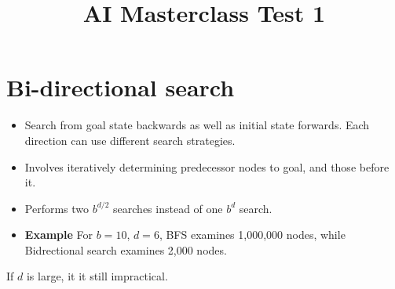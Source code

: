 \documentclass[12pt, a4paper]{article}
\title{AI Masterclass Test 1}
\author{}
\date{}
\begin{document}
\section{Bi-directional search}
\begin{itemize}
    \item Search from goal state backwards as well as initial state forwards. Each direction can use different search strategies.
    \item Involves iteratively determining predecessor nodes to goal, and those before it.
    \item Performs two $b^{d/2}$ searches instead of one $b^d$ search.
    \item \textbf{Example} For $b=10$, $d=6$, BFS examines 1,000,000 nodes, while Bidrectional search examines 2,000 nodes.
\end{itemize}If $d$ is large, it it still impractical.
\end{document}

